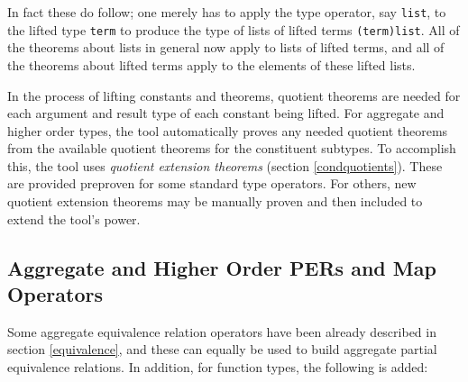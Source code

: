 \documentclass[envcountsame,runningheads]{llncs}
\newcommand{\quotient}{partial equivalence}
\begin{document}
In fact these do follow; one merely has to apply the type
operator, say {\tt list}, to the lifted type {\tt term} to produce
the type of lists of lifted terms {\tt (term)list}.  All of the
theorems about lists in general now apply to lists of lifted terms,
and all of the theorems about lifted terms apply to the elements of
these lifted lists.
\begin{comment}
\end{comment}

In the process of lifting constants and theorems,
quotient theorems are needed for each
argument and result type
of each constant being lifted.
For aggregate and higher order types,
the tool automatically proves any needed quotient theorems
from the available quotient theorems for the
constituent subtypes.
To accomplish this, the tool uses {\it quotient extension theorems\/}
(section \ref{condquotients}).
These are provided preproven for some standard type operators.
For others,
new quotient extension theorems may be manually proven and then
included to extend the tool's power.
\begin{comment}
\end{comment}


%
\subsection{Aggregate and Higher Order PERs and Map Operators}
%
\label{aggregates}

Some aggregate equivalence relation
operators have been already described in section \ref{equivalence}, and
these can equally be used to build aggregate \quotient{} relations.
In addition, for function types, the following is added:

\begin{center}
\end{center}
\end{document}
